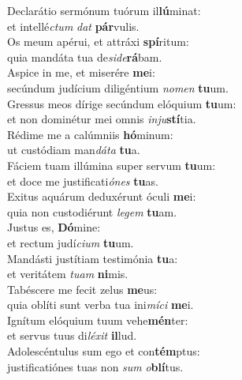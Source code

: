 \evenverse Declarátio sermónum tuórum il\textbf{lú}minat:~\*\\
\evenverse et intellé\textit{ctum} \textit{dat} \textbf{pár}vulis.\\
\oddverse Os meum apérui, et attráxi \textbf{spí}ritum:~\*\\
\oddverse quia mandáta tua de\textit{si}\textit{de}\textbf{rá}bam.\\
\evenverse Aspice in me, et miserére \textbf{me}i:~\*\\
\evenverse secúndum judícium diligéntium \textit{no}\textit{men} \textbf{tu}um.\\
\oddverse Gressus meos dírige secúndum elóquium \textbf{tu}um:~\*\\
\oddverse et non dominétur mei omnis \textit{in}\textit{ju}\textbf{stí}tia.\\
\evenverse Rédime me a calúmniis \textbf{hó}minum:~\*\\
\evenverse ut custódiam man\textit{dá}\textit{ta} \textbf{tu}a.\\
\oddverse Fáciem tuam illúmina super servum \textbf{tu}um:~\*\\
\oddverse et doce me justificati\textit{ó}\textit{nes} \textbf{tu}as.\\
\evenverse Exitus aquárum deduxérunt óculi \textbf{me}i:~\*\\
\evenverse quia non custodiérunt \textit{le}\textit{gem} \textbf{tu}am.\\
\oddverse Justus es, \textbf{Dó}mine:~\*\\
\oddverse et rectum judí\textit{ci}\textit{um} \textbf{tu}um.\\
\evenverse Mandásti justítiam testimónia \textbf{tu}a:~\*\\
\evenverse et veritátem \textit{tu}\textit{am} \textbf{ni}mis.\\
\oddverse Tabéscere me fecit zelus \textbf{me}us:~\*\\
\oddverse quia oblíti sunt verba tua ini\textit{mí}\textit{ci} \textbf{me}i.\\
\evenverse Ignítum elóquium tuum vehe\textbf{mén}ter:~\*\\
\evenverse et servus tuus di\textit{lé}\textit{xit} \textbf{il}lud.\\
\oddverse Adolescéntulus sum ego et con\textbf{tém}ptus:~\*\\
\oddverse justificatiónes tuas non \textit{sum} \textit{o}\textbf{blí}tus.\\
